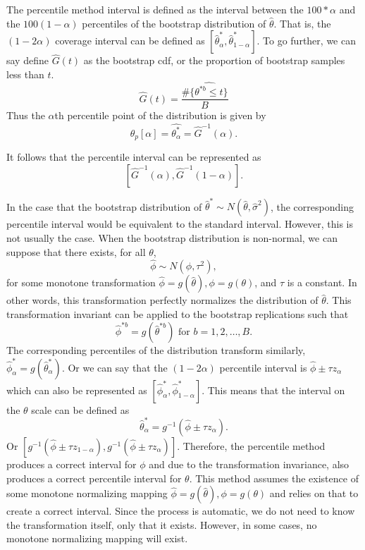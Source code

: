\documentclass[12pt]{article}
\begin{document}
The percentile method interval is defined as the interval between the
\(100 * \alpha\) and the \(100(1 - \alpha)\) percentiles of the
bootstrap distribution of \(\hat{\theta}\). That is, the
\((1 - 2\alpha)\) coverage interval can be defined as
\([\hat{\theta}^*_\alpha,\hat{\theta}^*_{1-\alpha}].\) To go further, we
can say define \(\hat{G}(t)\) as the bootstrap cdf, or the proportion of
bootstrap samples less than \(t\).
\[\hat{G}(t) = \frac{\#\{\hat{\theta^{*b} \leq t}\}}{B}\] Thus the
\(\alpha\)th percentile point of the distribution is given by
\[\hat{\theta}_p[\alpha] = \hat{\theta^*_\alpha} = \hat{G}^{-1}(\alpha).\]

It follows that the percentile interval can be represented as
\[\left [ \hat{G}^{-1}(\alpha),\hat{G}^{-1}(1-\alpha) \right ].\]

In the case that the bootstrap distribution of
\(\hat{\theta}^* \sim N(\hat{\theta}, \hat{\sigma}^2)\), the
corresponding percentile interval would be equivalent to the standard
interval. However, this is not usually the case. When the bootstrap
distribution is non-normal, we can suppose that there exists, for all
\(\theta\), \[\hat{\phi} \sim N(\phi, \tau^2),\] for some monotone
transformation \(\hat{\phi} = g(\hat{\theta}), \phi = g(\theta)\), and
\(\tau\) is a constant. In other words, this transformation perfectly
normalizes the distribution of \(\hat{\theta}\). This transformation
invariant can be applied to the bootstrap replications such that
\[\hat{\phi}^{*b} = g\left( \hat{\theta}^{*b}\right ) \text{ for } b = 1,2,\dots, B.\]
The corresponding percentiles of the distribution transform similarly,
\(\hat{\phi}^*_\alpha = g \left ( \hat{\theta}^*_\alpha \right )\). Or
we can say that the \((1 - 2\alpha)\) percentile interval is
\(\hat{\phi} \pm \tau z_\alpha\) which can also be represented as
\([\hat{\phi}^*_\alpha,\hat{\phi}^*_{1-\alpha}]\). This means that the
interval on the \(\theta\) scale can be defined as
\[\hat{\theta}^*_\alpha = g^{-1}(\hat{\phi} \pm \tau z_\alpha).\] Or
\(\left [ g^{-1}(\hat{\phi} \pm \tau z_{1-\alpha}), g^{-1}(\hat{\phi} \pm \tau z_\alpha) \right ]\).
Therefore, the percentile method produces a correct interval for
\(\phi\) and due to the transformation invariance, also produces a
correct percentile interval for \(\theta\). This method assumes the
existence of some monotone normalizing mapping
\(\hat{\phi} = g(\hat{\theta}), \phi = g(\theta)\) and relies on that to
create a correct interval. Since the process is automatic, we do not
need to know the transformation itself, only that it exists. However, in
some cases, no monotone normalizing mapping will exist.
\end{document}
